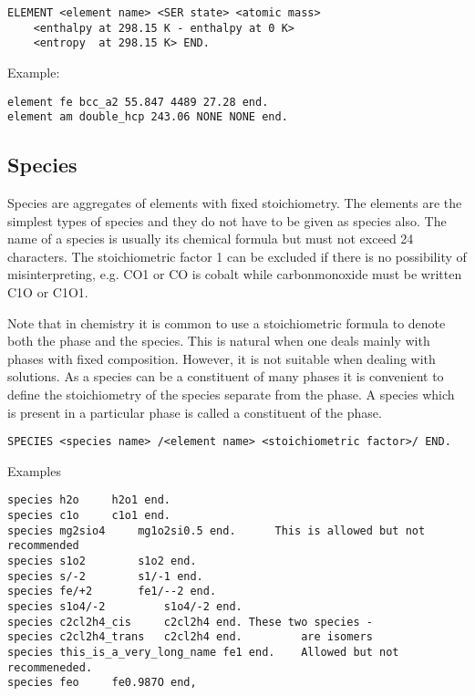 \documentclass[12pt]{article}
\begin{document}
\begin{verbatim}
ELEMENT <element name> <SER state> <atomic mass>
    <enthalpy at 298.15 K - enthalpy at 0 K>
    <entropy  at 298.15 K> END.
\end{verbatim}

Example:

\begin{verbatim}
element fe bcc_a2 55.847 4489 27.28 end.
element am double_hcp 243.06 NONE NONE end.
\end{verbatim}

\subsection{Species}

Species are aggregates of elements with fixed stoichiometry. The
elements are the simplest types of species and they do not have to
be given as species also. The name of a species is usually its
chemical formula but must not exceed 24 characters. The stoichiometric
factor 1 can be excluded if there is no possibility of
misinterpreting, e.g. CO1 or CO is cobalt while carbonmonoxide must be
written C1O or C1O1.

Note that in chemistry it is common to use a stoichiometric formula to
denote both the phase and the species. This is natural when one deals
mainly with phases with fixed composition. However, it is not suitable
when dealing with solutions. As a species can be a constituent of many
phases it is convenient to define the stoichiometry of the species
separate from the phase. A species which is present in a particular
phase is called a constituent of the phase.

\begin{verbatim}
SPECIES <species name> /<element name> <stoichiometric factor>/ END.
\end{verbatim}

Examples

\begin{verbatim}
species h2o		h2o1 end.
species c1o		c1o1 end.
species mg2sio4		mg1o2si0.5 end.      This is allowed but not recommended
species s1o2		s1o2 end.
species s/-2		s1/-1 end.
species fe/+2		fe1/--2 end.
species s1o4/-2			s1o4/-2 end.
species c2cl2h4_cis		c2cl2h4 end. These two species -
species c2cl2h4_trans	c2cl2h4 end.         are isomers
species this_is_a_very_long_name fe1 end.    Allowed but not recommeneded.
species feo		fe0.987O end,
\end{verbatim}
\end{document}
